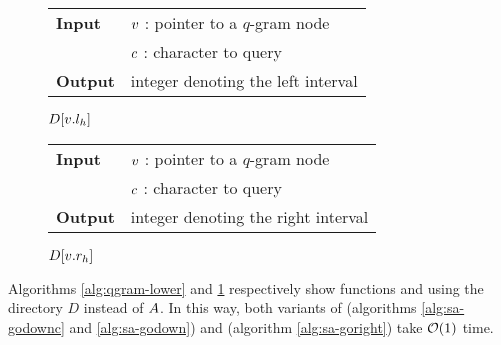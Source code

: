\begin{figure*}[b!]
\begin{minipage}[b]{.5\textwidth}
\begin{algorithm}[H]
\begin{tabular}{ll}
\textbf{Input}  & $v$ : pointer to a $q$-gram node\\
				& $c$ : character to query\\
\textbf{Output} & integer denoting the left interval\\
\end{tabular}
\begin{algorithmic}[1]
\State \Return $D[v.l_h]$
\end{algorithmic}
\label{alg:qgram-lower}
\end{algorithm}
\end{minipage}
\hfill
\begin{minipage}[b]{.5\textwidth}
\begin{algorithm}[H]
\begin{tabular}{ll}
\textbf{Input}  & $v$ : pointer to a $q$-gram node\\
				& $c$ : character to query\\
\textbf{Output} & integer denoting the right interval\\
\end{tabular}
\begin{algorithmic}[1]
\State \Return $D[v.r_h]$
\end{algorithmic}
\label{alg:qgram-upper}
\end{algorithm}
\end{minipage}
\end{figure*}

Algorithms \ref{alg:qgram-lower} and \ref{alg:qgram-upper} respectively show functions  and  using the directory $D$ instead of $A$.
In this way, both variants of  (algorithms \ref{alg:sa-godownc} and \ref{alg:sa-godown}) and  (algorithm \ref{alg:sa-goright}) take $\mathcal{O}(1)$ time.

